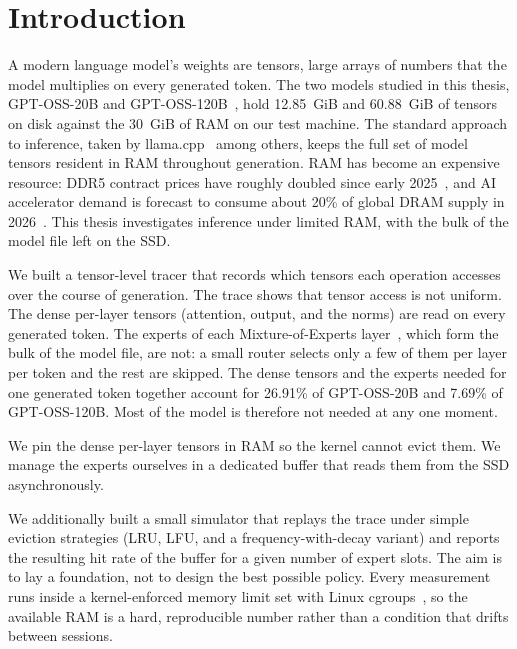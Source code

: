 \chapter{Introduction}\label{chapter:introduction}

A modern language model's weights are tensors, large arrays of numbers that the model multiplies on every generated token.
The two models studied in this thesis, GPT-OSS-20B and GPT-OSS-120B~\cite{openai2025gptoss}, hold 12.85~GiB and 60.88~GiB of tensors on disk against the 30~GiB of RAM on our test machine.
The standard approach to inference, taken by llama.cpp~\cite{ggerganov2023llamacpp} among others, keeps the full set of model tensors resident in RAM throughout generation.
RAM has become an expensive resource: DDR5 contract prices have roughly doubled since early 2025~\cite{counterpoint_ddr5,networkworld_ddr5}, and AI accelerator demand is forecast to consume about 20\% of global DRAM supply in 2026~\cite{trendforce_dram2026}.
This thesis investigates inference under limited RAM, with the bulk of the model file left on the SSD.

We built a tensor-level tracer that records which tensors each operation accesses over the course of generation.
The trace shows that tensor access is not uniform.
The dense per-layer tensors (attention, output, and the norms) are read on every generated token.
The experts of each Mixture-of-Experts layer~\cite{shazeer2017moe}, which form the bulk of the model file, are not: a small router selects only a few of them per layer per token and the rest are skipped.
The dense tensors and the experts needed for one generated token together account for 26.91\% of GPT-OSS-20B and 7.69\% of GPT-OSS-120B.
Most of the model is therefore not needed at any one moment.

We pin the dense per-layer tensors in RAM so the kernel cannot evict them.
We manage the experts ourselves in a dedicated buffer that reads them from the SSD asynchronously.

We additionally built a small simulator that replays the trace under simple eviction strategies (LRU, LFU, and a frequency-with-decay variant) and reports the resulting hit rate of the buffer for a given number of expert slots.
The aim is to lay a foundation, not to design the best possible policy.
Every measurement runs inside a kernel-enforced memory limit set with Linux cgroups~\cite{cgroupv2}, so the available RAM is a hard, reproducible number rather than a condition that drifts between sessions.

